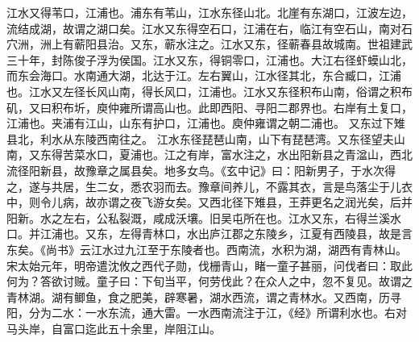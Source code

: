 \documentclass[12pt,UTF8]{ctexbook}
\begin{document}
江水又得苇口，江浦也。浦东有苇山，江水东径山北。北崖有东湖口，江波左边，流结成湖，故谓之湖口矣。江水又东得空石口，江浦在右，临江有空石山，南对石穴洲，洲上有蕲阳县治。又东，蕲水注之。江水又东，径蕲春县故城南。世祖建武三十年，封陈俊子浮为侯国。江水又东，得铜零口，江浦也。大江右径虾蟆山北，而东会海口。水南通大湖，北达于江。左右翼山，江水径其北，东合臧口，江浦也。江水又左径长风山南，得长风口，江浦也。江水又东径积布山南，俗谓之积布矶，又曰积布圻，庾仲雍所谓高山也。此即西阳、寻阳二郡界也。右岸有土复口，江浦也。夹浦有江山，山东有护口，江浦也。庾仲雍谓之朝二浦也。
又东过下雉县北，利水从东陵西南往之。
江水东径琵琶山南，山下有琵琶湾。又东径望夫山南，又东得苦菜水口，夏浦也。江之有岸，富水注之，水出阳新县之青湓山，西北流径阳新县，故豫章之属县矣。地多女鸟。《玄中记》曰：阳新男子，于水次得之，遂与共居，生二女，悉农羽而去。豫章间养儿，不露其衣，言是鸟落尘于儿衣中，则令儿病，故亦谓之夜飞游女矣。又西北径下雉县，王莽更名之润光矣，后并阳新。水之左右，公私裂溉，咸成沃壤。旧吴屯所在也。江水又东，右得兰溪水口。并江浦也。又东，左得青林口，水出庐江郡之东陵乡，江夏有西陵县，故是言东矣。《尚书》云江水过九江至于东陵者也。西南流，水积为湖，湖西有青林山。宋太始元年，明帝遣沈攸之西代子勋，伐栅青山，睹一童子甚丽，问伐者曰：取此何为？答欲讨贼。童子曰：下旬当平，何劳伐此？在众人之中，忽不复见。故谓之青林湖。湖有鲫鱼，食之肥美，辟寒暑，湖水西流，谓之青林水。又西南，历寻阳，分为二水：一水东流，通大雷。一水西南流注于江，《经》所谓利水也。右对马头岸，自富口迄此五十余里，岸阻江山。
\end{document}
